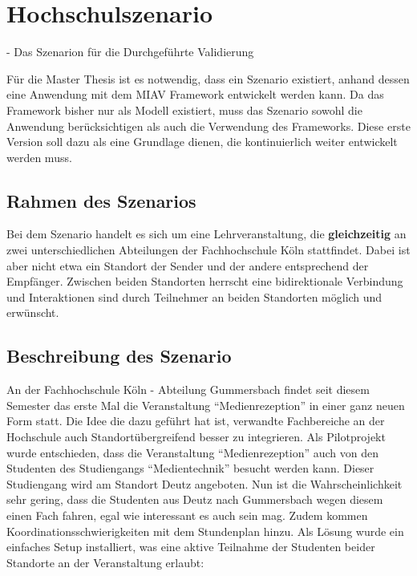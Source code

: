 
\section{Hochschulszenario} %
\label{sec:hochschulszenario}

  - Das Szenarion für die Durchgeführte Validierung

  Für die Master Thesis ist es notwendig, dass ein Szenario existiert, anhand dessen eine Anwendung mit dem MIAV Framework entwickelt werden kann. Da das Framework bisher nur als Modell existiert, muss das Szenario sowohl die Anwendung berücksichtigen als auch die Verwendung des Frameworks. Diese erste Version soll dazu als eine Grundlage dienen, die kontinuierlich weiter entwickelt werden muss.

\subsection{Rahmen des Szenarios} %
\label{ssec:rahmen_des_szenarios}

  Bei dem Szenario handelt es sich um eine Lehrveranstaltung, die \textbf{gleichzeitig} an zwei unterschiedlichen Abteilungen der Fachhochschule Köln stattfindet. Dabei ist aber nicht etwa ein Standort der Sender und der andere entsprechend der Empfänger. Zwischen beiden Standorten herrscht eine bidirektionale Verbindung und Interaktionen sind durch Teilnehmer an beiden Standorten möglich und erwünscht.


\subsection{Beschreibung des Szenario} %
\label{sub:beschreibung_des_szenario}

  An der Fachhochschule Köln - Abteilung Gummersbach findet seit diesem Semester das erste Mal die Veranstaltung "`Medienrezeption"' in einer ganz neuen Form statt. Die Idee die dazu geführt hat ist, verwandte Fachbereiche an der Hochschule auch Standortübergreifend besser zu integrieren. Als Pilotprojekt wurde entschieden, dass die Veranstaltung "`Medienrezeption"' auch von den Studenten des Studiengangs "`Medientechnik"' besucht werden kann. Dieser Studiengang wird am Standort Deutz angeboten. Nun ist die Wahrscheinlichkeit sehr gering, dass die Studenten aus Deutz nach Gummersbach wegen diesem einen Fach fahren, egal wie interessant es auch sein mag. Zudem kommen Koordinationsschwierigkeiten mit dem Stundenplan hinzu. Als Lösung wurde ein einfaches Setup installiert, was eine aktive Teilnahme der Studenten beider Standorte an der Veranstaltung erlaubt:

